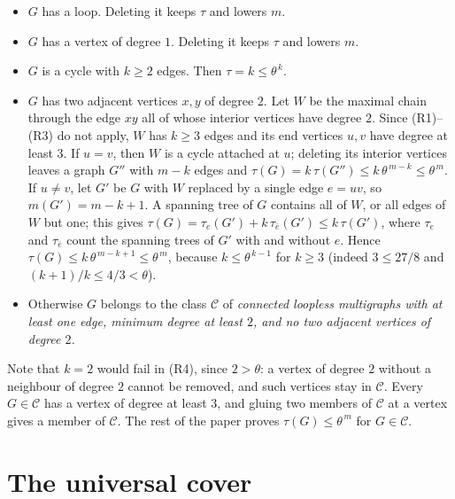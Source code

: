 \documentclass[11pt]{amsart}
\theoremstyle{plain}
\theoremstyle{remark}
\newcommand{\cC}{\mathcal{C}}
\newcommand{\tht}{\theta}
\begin{document}
\begin{itemize}
\item[(R1)] $G$ has a loop. Deleting it keeps $\tau$ and lowers $m$.
\item[(R2)] $G$ has a vertex of degree $1$. Deleting it keeps $\tau$ and lowers $m$.
\item[(R3)] $G$ is a cycle with $k\ge2$ edges. Then $\tau=k\le\tht^{\,k}$.
\item[(R4)] $G$ has two adjacent vertices $x,y$ of degree $2$. Let $W$ be the maximal chain through the edge $xy$
  all of whose interior vertices have degree $2$. Since (R1)--(R3) do not apply, $W$ has $k\ge3$ edges and its end
  vertices $u,v$ have degree at least $3$.
  If $u=v$, then $W$ is a cycle attached at $u$; deleting its interior vertices leaves a graph $G''$ with $m-k$
  edges and $\tau(G)=k\,\tau(G'')\le k\,\tht^{\,m-k}\le\tht^{\,m}$.
  If $u\ne v$, let $G'$ be $G$ with $W$ replaced by a single edge $e=uv$, so $m(G')=m-k+1$. A spanning tree of $G$
  contains all of $W$, or all edges of $W$ but one; this gives
  $\tau(G)=\tau_e(G')+k\,\tau_{\bar e}(G')\le k\,\tau(G')$, where $\tau_e$ and $\tau_{\bar e}$ count the spanning trees
  of $G'$ with and without $e$. Hence $\tau(G)\le k\,\tht^{\,m-k+1}\le\tht^{\,m}$, because $k\le\tht^{\,k-1}$ for
  $k\ge3$ (indeed $3\le27/8$ and $(k+1)/k\le4/3<\tht$).
\item[(R5)] Otherwise $G$ belongs to the class $\cC$ of \emph{connected loopless multigraphs with at least one
  edge, minimum degree at least $2$, and no two adjacent vertices of degree $2$.}
\end{itemize}
Note that $k=2$ would fail in (R4), since $2>\tht$: a vertex of degree $2$ without a neighbour of degree $2$
cannot be removed, and such vertices stay in $\cC$. Every $G\in\cC$ has a vertex of degree at least $3$, and gluing two members of $\cC$ at a vertex gives a
member of $\cC$. The rest of the paper proves $\tau(G)\le\tht^{\,m}$ for $G\in\cC$.

\section{The universal cover}\label{sec:cover}
\end{document}
